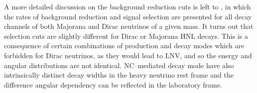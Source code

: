 A more detailed discussion on the background reduction cuts is left to , %
in which the rates of background reduction and signal selection are presented %
for all decay channels of both Majorana and Dirac neutrinos of a given mass.
It turns out that selection cuts are slightly different for Dirac or Majorana HNL decays.
This is a consequence of certain combinations of production and decay modes which are forbidden for Dirac neutrinos, %
as they would lead to LNV, and so the energy and angular distributions are not identical.
NC--mediated decay mode have also intrinsically distinct decay widths in the heavy neutrino rest frame %
and the difference angular dependency can be reflected in the laboratory frame.



